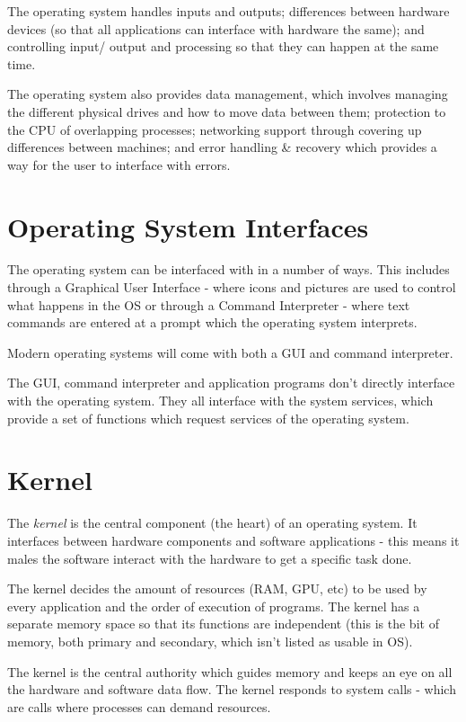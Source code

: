 The operating system handles inputs and outputs; differences between hardware devices (so that all applications can interface with hardware the same); and controlling input/ output and processing so that they can happen at the same time.

The operating system also provides data management, which involves managing the different physical drives and how to move data between them; protection to the CPU of overlapping processes; networking support through covering up differences between machines; and error handling \& recovery which provides a way for the user to interface with errors. 

\section{Operating System Interfaces}
The operating system can be interfaced with in a number of ways. This includes through a Graphical User Interface - where icons and pictures are used to control what happens in the OS or through a Command Interpreter - where text commands are entered at a prompt which the operating system interprets.

Modern operating systems will come with both a GUI and command interpreter.

The GUI, command interpreter and application programs don't directly interface with the operating system. They all interface with the system services, which provide a set of functions which request services of the operating system.

\section{Kernel}
The \textit{kernel} is the central component (the heart) of an operating system. It interfaces between hardware components and software applications - this means it males the software interact with the hardware to get a specific task done. 

The kernel decides the amount of resources (RAM, GPU, etc) to be used by every application and the order of execution of programs. The kernel has a separate memory space so that its functions are independent (this is the bit of memory, both primary and secondary, which isn't listed as usable in OS). 

The kernel is the central authority which guides memory and keeps an eye on all the hardware and software data flow. The kernel responds to system calls - which are calls where processes can demand resources. 
